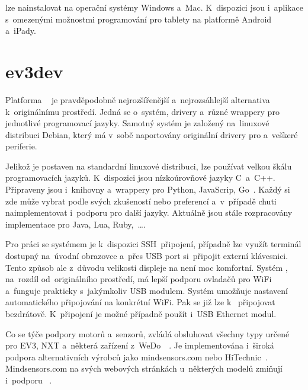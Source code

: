 \legoSW{} lze nainstalovat na operační systémy Windows a~Mac. K~dispozici jsou i~aplikace s~omezenými možnostmi programování pro tablety na platformě Android a~iPady.


\section{ev3dev}
\label{lego-ev3dev}

Platforma \evThreeDev{}~\cite{legoMindstormsEV3_ev3dev} je pravděpodobně nejrozšířenější a~nejrozsáhlejší alternativa k~originálnímu \lego{} prostředí.
Jedná se o~systém, drivery a~různé wrappery pro jednotlivé programovací jazyky. 
Samotný systém je založený na~linuxové distribuci Debian, který má v~sobě naportovány originální \lego{} drivery pro \EVbrick{} a~veškeré periferie.

Jelikož je \evThreeDev{} postaven na standardní linuxové distribuci, lze používat velkou škálu programovacích jazyků. 
K~dispozici jsou nízkoúrovňové jazyky C~a~C++. 
Připraveny jsou i~knihovny a~wrappery pro Python, JavaScrip, Go~\cite{legoMindstormsEV3_ev3dev-prog-lang}. 
Každý si zde může vybrat podle svých zkušeností nebo preferencí a~v~případě chuti naimplementovat i~podporu pro další jazyky. 
Aktuálně jsou stále rozpracovány implementace pro Java, Lua, Ruby,~\dots{}.

Pro práci se systémem je k~dispozici SSH~připojení, případně lze využít terminál dostupný na~úvodní obrazovce a~přes USB port si~připojit externí klávesnici. 
Tento způsob ale z~důvodu velikosti displeje na  není moc komfortní. 
Systém \evThreeDev{}, na~rozdíl od~originálního \lego{} prostředí, má lepší podporu ovladačů pro WiFi a~funguje prakticky s~jakýmkoliv USB modulem. 
Systém umožňuje nastavení automatického připojování na konkrétní WiFi. Pak se již lze k~ připojovat bezdrátově.
K~připojení je možné případně použít i~USB Ethernet modul.
 
Co se týče podpory \lego{} motorů a~senzorů, \evThreeDev{} zvládá obsluhovat všechny typy určené pro EV3, NXT a~některá zařízení z~WeDo~\cite{legoMindstormsEV3_ev3dev-support-motors}~\cite{legoMindstormsEV3_ev3dev-support-sensors}.
Je implementována i~široká podpora alternativních výrobců jako mindsensors.com nebo HiTechnic~\cite{baichtal2016hacking}. 
Mindsensors.com na svých webových stránkách u~některých modelů zmiňují i~podporu \evThreeDev{}~\cite{lego_mindsensor_gyro}.  

